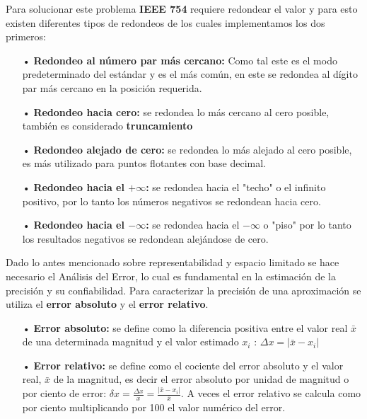 \documentclass[a4paper,10pt,twocolumn]{article}
\begin{document}
	Para solucionar este problema \textbf{IEEE 754} requiere redondear el valor y para esto existen diferentes tipos de redondeos de los cuales implementamos los dos primeros: \\
	\begin{itemize}
		\item[•] \textbf{Redondeo al número par más cercano:} Como tal este es el modo predeterminado del estándar y es el más común, en este se redondea al dígito par más cercano en la posición requerida. \\
		\item[•] \textbf{Redondeo hacia cero:} se redondea lo más cercano al cero posible, también es considerado \textbf{truncamiento}
		\item[•]\textbf{Redondeo alejado de cero:} se redondea lo más alejado al cero posible, es más utilizado para puntos flotantes con base decimal.\\
		\item[•] \textbf{Redondeo hacia el $+\infty$:} se redondea hacia el "techo" o el infinito positivo, por lo tanto los números negativos se redondean hacia cero.\\
		\item[•]\textbf{Redondeo hacia el $-\infty$:} se redondea hacia el $-\infty$ o "piso" por lo tanto los resultados negativos se redondean alejándose de cero.
		
	\end{itemize}
	
	Dado lo antes mencionado sobre representabilidad y espacio limitado se hace necesario el Análisis del Error, lo cual es fundamental en la estimación de la precisión y su confiabilidad. Para caracterizar la precisión de una aproximación se utiliza el \textbf{error absoluto} y el \textbf{error relativo}.\\
	
	\begin{itemize}
		\item[•] \textbf{Error absoluto:} se define como la diferencia positiva entre el valor real $\bar{x}$ de una determinada magnitud y el valor estimado $x_i$ : $\Delta x =|\bar{x} - x_i|$
		
		\item[•] \textbf{Error relativo:} se define como el cociente del error absoluto y el valor real, $\bar{x}$ de la magnitud, es decir el error absoluto por unidad de magnitud o por ciento de error: $\delta x = \frac{\Delta x}{x} = \frac{|\bar{x} - x_i|}{\bar{x}}$. A veces el error relativo se calcula como por ciento multiplicando por 100 el valor numérico del error.\\
	\end{itemize}
	
\end{document}
